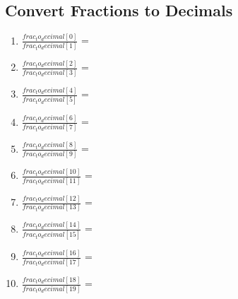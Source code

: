 \documentclass[11pt]{article}
\begin{document}
\subsection{Convert Fractions to Decimals}
\begin{enumerate}
	\item $\frac{ {{ frac_to_decimal[0] }} }{ {{ frac_to_decimal[1] }} }$ = 
	\item $\frac{ {{ frac_to_decimal[2] }} }{ {{ frac_to_decimal[3] }} }$ = 
	\item $\frac{ {{ frac_to_decimal[4] }} }{ {{ frac_to_decimal[5] }} }$ = 
	\item $\frac{ {{ frac_to_decimal[6] }} }{ {{ frac_to_decimal[7] }} }$ = 
	\item $\frac{ {{ frac_to_decimal[8] }} }{ {{ frac_to_decimal[9] }} }$ = 
	\item $\frac{ {{ frac_to_decimal[10] }} }{ {{ frac_to_decimal[11] }} }$ = 
	\item $\frac{ {{ frac_to_decimal[12] }} }{ {{ frac_to_decimal[13] }} }$ = 
	\item $\frac{ {{ frac_to_decimal[14] }} }{ {{ frac_to_decimal[15] }} }$ = 
	\item $\frac{ {{ frac_to_decimal[16] }} }{ {{ frac_to_decimal[17] }} }$ = 
	\item $\frac{ {{ frac_to_decimal[18] }} }{ {{ frac_to_decimal[19] }} }$ = 
\end{enumerate}
\end{document}
